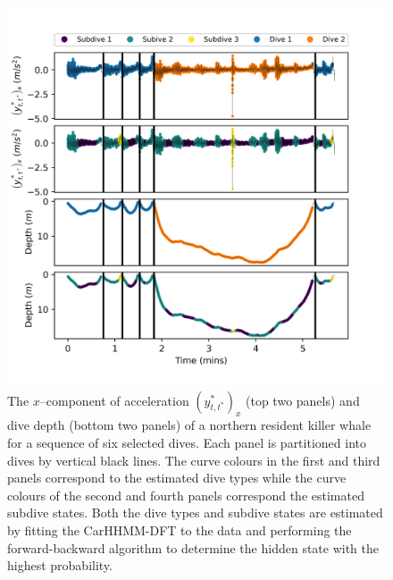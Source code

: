 \begin{figure}[ht]
	\centering
	\includegraphics[width=4.75in]{../Plots/2019/20190902-182840-CATs_OB_1_0_267_CarHHMM2_decoded_dives.png}
	\caption{The $x$--component of acceleration $\left(y^*_{t,t^*}\right)_x$ (top two panels) and dive depth (bottom two panels) of a northern resident killer whale for a sequence of six selected dives. Each panel is partitioned into dives by vertical black lines. The curve colours in the first and third panels correspond to the estimated dive types while the curve colours of the second and fourth panels correspond the estimated subdive states. Both the dive types and subdive states are estimated by fitting the CarHHMM-DFT to the data and performing the forward-backward algorithm to determine the hidden state with the highest probability.}
	\label{fig:labeled_dives}
\end{figure}

